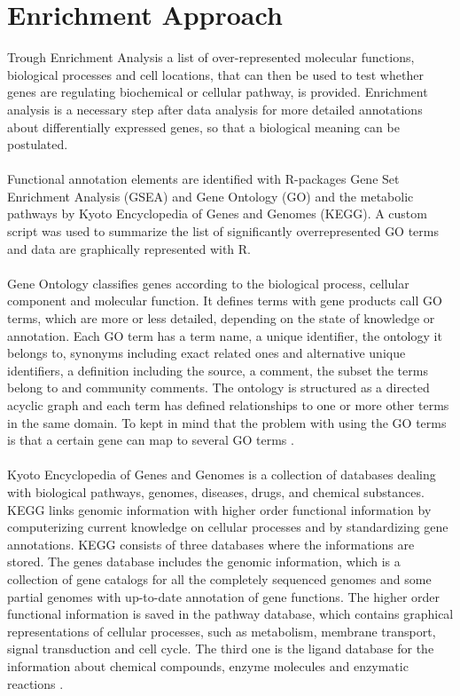 \documentclass[12pt, a4paper]{report}
\begin{document}
\section{Enrichment Approach}
Trough Enrichment Analysis a list of over-represented molecular functions, biological processes and cell locations, that can then be used to test whether genes are regulating biochemical or cellular pathway, is provided. Enrichment analysis is a necessary step after data analysis for more detailed annotations about differentially expressed genes, so that a biological meaning can be postulated. \\ 
\ \\
Functional annotation elements are identified with R-packages Gene Set Enrichment Analysis (GSEA) \cite{Subramanian2005} and Gene Ontology (GO) and the metabolic pathways by Kyoto Encyclopedia of Genes and Genomes (KEGG). 
A custom script was used to summarize the list of significantly overrepresented GO terms and data are graphically represented with R. \\
\ \\
Gene Ontology classifies genes according to the biological process, cellular component and molecular function. It defines terms with gene products call GO terms, which are more or less detailed, depending on the state of knowledge or annotation. 
Each GO term has a term name, a unique identifier, the ontology it belongs to, synonyms including exact related ones and alternative unique identifiers, a definition including the source, a comment, the subset the terms belong to and community comments. The ontology is structured as a directed acyclic graph and each term has defined relationships to one or more other terms in the same domain. To kept in mind that the problem with using the GO terms is that a certain gene can map to several GO terms \cite{Ashburner2000}. \\
\ \\
Kyoto Encyclopedia of Genes and Genomes is a collection of databases dealing with biological pathways, genomes, diseases, drugs, and chemical substances. KEGG links genomic information with higher order functional information by computerizing current knowledge on cellular processes and by standardizing gene annotations. KEGG consists of three databases where the informations are stored. The genes database includes the genomic information, which is a collection of gene catalogs for all the completely sequenced genomes and some partial genomes with up-to-date annotation of gene functions. The higher order functional information is saved in the pathway database, which contains graphical representations of cellular processes, such as metabolism, membrane transport, signal transduction and cell cycle. The third one is the ligand database for the information about chemical compounds, enzyme molecules and enzymatic reactions \cite{kanehisa2000}. 
\end{document}
